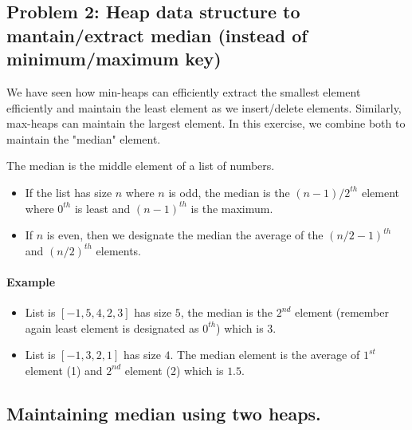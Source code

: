 \documentclass[
]{article}
\providecommand{\tightlist}{%
  \setlength{\itemsep}{0pt}\setlength{\parskip}{0pt}}
\begin{document}
\hypertarget{problem-2-heap-data-structure-to-mantainextract-median-instead-of-minimummaximum-key}{%
\subsection{Problem 2: Heap data structure to mantain/extract median
(instead of minimum/maximum
key)}\label{problem-2-heap-data-structure-to-mantainextract-median-instead-of-minimummaximum-key}}

We have seen how min-heaps can efficiently extract the smallest element
efficiently and maintain the least element as we insert/delete elements.
Similarly, max-heaps can maintain the largest element. In this exercise,
we combine both to maintain the "median" element.

The median is the middle element of a list of numbers.

\begin{itemize}
\tightlist
\item
  If the list has size \(n\) where \(n\) is odd, the median is the
  \((n-1)/2^{th}\) element where \(0^{th}\) is least and \((n-1)^{th}\)
  is the maximum.
\item
  If \(n\) is even, then we designate the median the average of the
  \((n/2-1)^{th}\) and \((n/2)^{th}\) elements.
\end{itemize}

\hypertarget{example}{%
\paragraph{Example}\label{example}}

\begin{itemize}
\tightlist
\item
  List is \([-1, 5, 4, 2, 3]\) has size \(5\), the median is the
  \(2^{nd}\) element (remember again least element is designated as
  \(0^{th}\)) which is \(3\).
\item
  List is \([-1, 3, 2, 1 ]\) has size \(4\). The median element is the
  average of \(1^{st}\) element (1) and \(2^{nd}\) element (2) which is
  \(1.5\).
\end{itemize}

\hypertarget{maintaining-median-using-two-heaps}{%
\subsection{Maintaining median using two
heaps.}\label{maintaining-median-using-two-heaps}}
\end{document}
